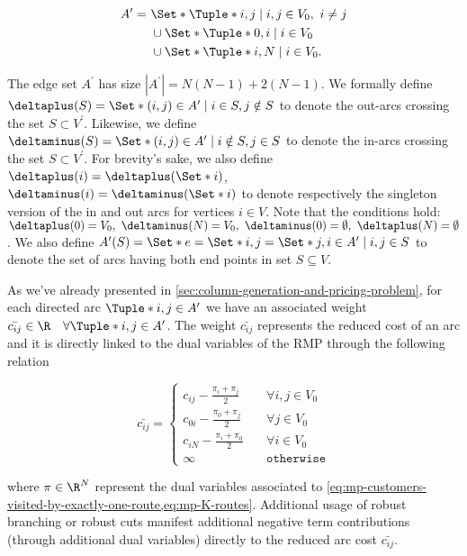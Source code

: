 \begin{equation}
	\begin{aligned}
		A^\prime = \  & \Set*{\Tuple*{i, j} \mid i, j \in V_0,\ i \ne j} \\
		              & \cup \Set*{\Tuple*{0, i} \mid i \in V_0}         \\
		              & \cup \Set*{\Tuple*{i, N} \mid i \in V_0}.
	\end{aligned}
\end{equation}

The edge set $A^\prime$ has size $|A^\prime| = N(N - 1) + 2(N - 1)$.
We formally define $\deltaplus(S) = \Set*{(i, j) \in A^\prime \mid i \in S, j \notin S}$
to denote the out-arcs crossing the set $S \subset V^\prime$.
Likewise, we define $\deltaminus(S) = \Set*{(i, j) \in A^\prime \mid i \notin S, j \in S}$
to denote the in-arcs crossing the set $S \subset V^\prime$.
For brevity’s sake,
we also define $\deltaplus(i) = \deltaplus(\Set*{i})$, $\deltaminus(i) = \deltaminus(\Set*{i})$
to denote respectively the singleton version of the in and out arcs for vertices $i \in V$.
Note that the conditions hold:
$\deltaplus(0) = V_0,\ \deltaminus(N) = V_0,\ \deltaminus(0) = \emptyset,\ \deltaplus(N) = \emptyset$.
We also define $A^\prime(S) = \Set*{e = \Set*{i, j} = \Set*{j, i}\in A^\prime \mid i, j \in S}$
to denote the set of arcs having both end points in set $S \subseteq V$.


As we've already presented in \cref{sec:column-generation-and-pricing-problem},
for each directed arc $\Tuple*{i, j} \in A^\prime$
we have an associated weight $\bar{c_{ij}} \in \R \quad \forall \Tuple*{i, j} \in A^\prime$.
The weight $\bar{c_{ij}}$ represents the reduced cost of an arc
and it is directly linked to the dual variables of the RMP through the following relation

\begin{equation}
	\bar{c_{ij}} = \begin{cases}
		c_{ij} - \frac{\pi_i + \pi_j}{2} & \quad \forall i, j \in V_0 \\
		c_{0i} - \frac{\pi_0 + \pi_j}{2} & \quad \forall j \in V_0    \\
		c_{iN} - \frac{\pi_i + \pi_0}{2} & \quad \forall i \in V_0    \\
		\infty                           & \quad \texttt{otherwise}
	\end{cases}
\end{equation}

where $\pi \in \R^N$ represent the dual variables associated
to \cref{eq:mp-customers-visited-by-exactly-one-route,eq:mp-K-routes}.
Additional usage of robust branching or robust cuts manifest additional negative
term contributions (through additional dual variables)
directly to the reduced arc cost $\bar{c_{ij}}$.

